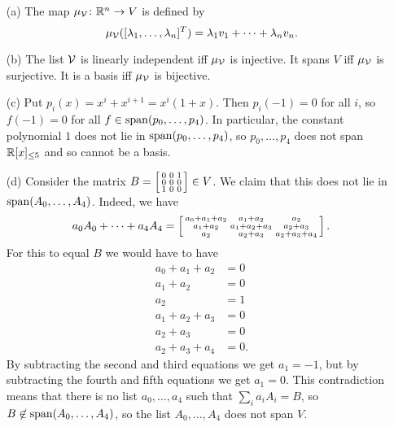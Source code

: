 \documentclass[a4paper]{article}
\begin{document}
\begin{solution}
 \begin{itemize}
  \item[(a)] The map $\mu_{\mathcal{V}}\colon{\mathbb{R}}^n\to V$ is defined by
   \[ \mu_{\mathcal{V}}([\lambda_1,\dotsc,\lambda_n]^T) = 
       \lambda_1v_1+\dotsb+\lambda_nv_n.
   \]
  \item[(b)] The list $\mathcal{V}$ is linearly independent iff
   $\mu_{\mathcal{V}}$ is injective.  It spans $V$ iff $\mu_{\mathcal{V}}$ is
   surjective.  It is a basis iff $\mu_{\mathcal{V}}$ is bijective.
  \item[(c)] Put $p_i(x)=x^i+x^{i+1}=x^i(1+x)$.  Then
   $p_i(-1)=0$ for all $i$, so $f(-1)=0$ for all
   $f\in\operatorname{span}(p_0,\dotsc,p_4)$.  In particular, the constant
   polynomial $1$ does not lie in $\operatorname{span}(p_0,\dotsc,p_4)$, so
   $p_0,\dotsc,p_4$ does not span ${\mathbb{R}}[x]_{\leq 5}$ and so
   cannot be a basis.
  \item[(d)] Consider the matrix
   $B=\left[\begin{smallmatrix} 0&0&1\\0&0&0\\1&0&0\end{smallmatrix}\right]\in V$.  We claim that
   this does not lie in $\operatorname{span}(A_0,\dotsc,A_4)$.  Indeed, we
   have
   \[ a_0A_0+\dotsb+a_4A_4 = 
       \left[\begin{smallmatrix} a_0+a_1+a_2 & a_1+a_2 & a_2 \\
            a_1+a_2 & a_1+a_2+a_3 & a_2+a_3 \\
            a_2 & a_2+a_3 & a_2+a_3+a_4 \end{smallmatrix}\right].
   \]
   For this to equal $B$ we would have to have
   \begin{align*}
    a_0+a_1+a_2 &= 0 \\
    a_1+a_2 &= 0 \\
    a_2 &= 1 \\
    a_1+a_2+a_3 &= 0 \\
    a_2+a_3 &= 0 \\
    a_2+a_3+a_4 &= 0.
   \end{align*}
   By subtracting the second and third equations we get
   $a_1=-1$, but by subtracting the fourth and fifth
   equations we get $a_1=0$.  This contradiction means that
   there is no list $a_0,\dotsc,a_4$ such that
   $\sum_ia_iA_i=B$, so $B\not\in\operatorname{span}(A_0,\dotsc,A_4)$, so
   the list $A_0,\dotsc,A_4$ does not span $V$.
 \end{itemize}
\end{solution}
\end{document}

